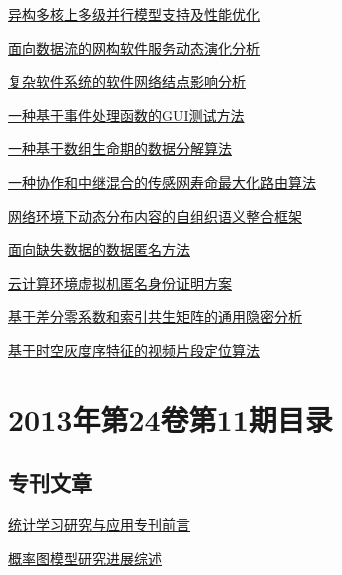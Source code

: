 \documentclass[a4paper]{article}
\begin{document}
\href{http://www.jos.org.cn/ch/reader/download_pdf.aspx?file_no=4386&year_id=2013&quarter_id=12&falg=1}{异构多核上多级并行模型支持及性能优化}

\href{http://www.jos.org.cn/ch/reader/download_pdf.aspx?file_no=4396&year_id=2013&quarter_id=12&falg=1}{面向数据流的网构软件服务动态演化分析}

\href{http://www.jos.org.cn/ch/reader/download_pdf.aspx?file_no=4397&year_id=2013&quarter_id=12&falg=1}{复杂软件系统的软件网络结点影响分析}

\href{http://www.jos.org.cn/ch/reader/download_pdf.aspx?file_no=4399&year_id=2013&quarter_id=12&falg=1}{一种基于事件处理函数的GUI测试方法}

\href{http://www.jos.org.cn/ch/reader/download_pdf.aspx?file_no=4405&year_id=2013&quarter_id=12&falg=1}{一种基于数组生命期的数据分解算法}

\href{http://www.jos.org.cn/ch/reader/download_pdf.aspx?file_no=4380&year_id=2013&quarter_id=12&falg=1}{一种协作和中继混合的传感网寿命最大化路由算法}

\href{http://www.jos.org.cn/ch/reader/download_pdf.aspx?file_no=4431&year_id=2013&quarter_id=12&falg=1}{网络环境下动态分布内容的自组织语义整合框架}

\href{http://www.jos.org.cn/ch/reader/download_pdf.aspx?file_no=4411&year_id=2013&quarter_id=12&falg=1}{面向缺失数据的数据匿名方法}

\href{http://www.jos.org.cn/ch/reader/download_pdf.aspx?file_no=4389&year_id=2013&quarter_id=12&falg=1}{云计算环境虚拟机匿名身份证明方案}

\href{http://www.jos.org.cn/ch/reader/download_pdf.aspx?file_no=4402&year_id=2013&quarter_id=12&falg=1}{基于差分零系数和索引共生矩阵的通用隐密分析}

\href{http://www.jos.org.cn/ch/reader/download_pdf.aspx?file_no=4415&year_id=2013&quarter_id=12&falg=1}{基于时空灰度序特征的视频片段定位算法}


\section{\textbf{2013年第24卷第11期目录}}
\subsection{专刊文章}
\href{http://www.jos.org.cn/ch/reader/download_pdf.aspx?file_no=4487&year_id=2013&quarter_id=11&falg=1}{统计学习研究与应用专刊前言}

\href{http://www.jos.org.cn/ch/reader/download_pdf.aspx?file_no=4486&year_id=2013&quarter_id=11&falg=1}{概率图模型研究进展综述}
\end{document}
